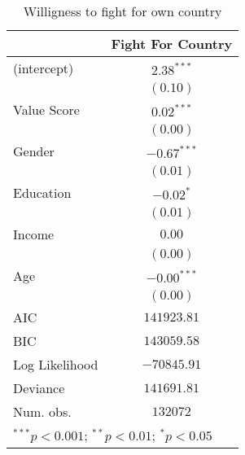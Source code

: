 
\usepackage{booktabs}

\begin{table}
\begin{center}
\begin{tabular}{l c}
\toprule
 & Fight For Country \\
\midrule
(intercept)    & $2.38^{***}$  \\
               & $(0.10)$      \\
Value Score    & $0.02^{***}$  \\
               & $(0.00)$      \\
Gender         & $-0.67^{***}$ \\
               & $(0.01)$      \\
Education      & $-0.02^{*}$   \\
               & $(0.01)$      \\
Income         & $0.00$        \\
               & $(0.00)$      \\
Age            & $-0.00^{***}$ \\
               & $(0.00)$      \\
\midrule
AIC            & $141923.81$   \\
BIC            & $143059.58$   \\
Log Likelihood & $-70845.91$   \\
Deviance       & $141691.81$   \\
Num. obs.      & $132072$      \\
\bottomrule
\multicolumn{2}{l}{\scriptsize{$^{***}p<0.001$; $^{**}p<0.01$; $^{*}p<0.05$}}
\end{tabular}
\caption{Willigness to fight for own country}
\label{FCreg}
\end{center}
\end{table}
